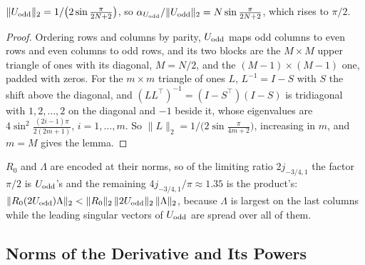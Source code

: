 \begin{lemma}
\label{lem:uodd-norm}
$\|U_{\mathrm{odd}}\|_2=1/\bigl(2\sin\frac{\pi}{2N+2}\bigr)$, so $\alpha_{U_{\mathrm{odd}}}/\|U_{\mathrm{odd}}\|_2=N\sin\frac{\pi}{2N+2}$, which rises to $\pi/2$.
\end{lemma}
\begin{proof}
Ordering rows and columns by parity, $U_{\mathrm{odd}}$ maps odd columns to even rows and even columns to odd rows, and its two blocks are the $M\times M$ upper triangle of ones with its diagonal, $M=N/2$, and the $(M-1)\times(M-1)$ one, padded with zeros. For the $m\times m$ triangle of ones $L$, $L^{-1}=I-S$ with $S$ the shift above the diagonal, and $(LL^{\top})^{-1}=(I-S^{\top})(I-S)$ is tridiagonal with $1,2,\dots,2$ on the diagonal and $-1$ beside it, whose eigenvalues are $4\sin^2\frac{(2i-1)\pi}{2(2m+1)}$, $i=1,\dots,m$. So $\|L\|_2=1/\bigl(2\sin\frac{\pi}{4m+2}\bigr)$, increasing in $m$, and $m=M$ gives the lemma.
\end{proof}

$R_0$ and $\Lambda$ are encoded at their norms, so of the limiting ratio $2j_{-3/4,1}$ the factor $\pi/2$ is $U_{\mathrm{odd}}$'s and the remaining $4j_{-3/4,1}/\pi\approx1.35$ is the product's: $\|R_0(2U_{\mathrm{odd}})\Lambda\|_2<\|R_0\|_2\,\|2U_{\mathrm{odd}}\|_2\,\|\Lambda\|_2$, because $\Lambda$ is largest on the last columns while the leading singular vectors of $U_{\mathrm{odd}}$ are spread over all of them.

\subsection{Norms of the Derivative and Its Powers}
\label{app:G-limits}

